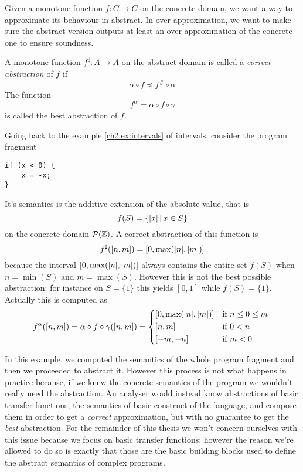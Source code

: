 Given a monotone function $f : C \rightarrow C$ on the concrete domain, we want a way to approximate its behaviour in abstract. In over approximation, we want to make sure the abstract version outputs at least an over-approximation of the concrete one to ensure soundness.
\begin{definition}
	A monotone function $f^{\sharp} : A \rightarrow A$ on the abstract domain is called a \textit{correct abstraction} of $f$ if
	\[
	\alpha \circ f \preceq f^{\#} \circ \alpha
	\]
	The function
	\[
	f^{\alpha} = \alpha \circ f \circ \gamma
	\]
	is called the best abstraction of $f$.
\end{definition}
\begin{example}
	Going back to the example \ref{ch2:ex:intervals} of intervals, consider the program fragment
\begin{verbatim}
if (x < 0) {
	x = -x;
}
\end{verbatim}
	It's semantics is the additive extension of the absolute value, that is
	\[
	f(S) = \{ \lvert x\rvert \,\vert\, x \in S \}
	\]
	on the concrete domain $\mathcal{P}(\mathbb{Z})$. A correct abstraction of this function is
	\[
	f^{\sharp}([n, m]) = [0, \max(\lvert n\rvert, \lvert m\rvert)]
	\]
	because the interval $[0, \max(\lvert n\rvert, \lvert m\rvert)]$ always contains the entire set $f(S)$ when $n = \min(S)$ and $m = \max(S)$. However this is not the best possible abstraction: for instance on $S = \{ 1 \}$ this yields $[0, 1]$ while $f(S) = \{ 1 \}$. Actually this is computed as
	\[
	f^{\alpha}([n, m]) = \alpha \circ f \circ \gamma([n, m]) = \begin{cases*}
		[0, \max(\abs{n}, \abs{m})] &if $n \le 0 \le m$ \\
		[n, m] &if $0 < n$ \\
		[-m, -n] &if $m < 0$ \\
	\end{cases*}
	\]
\end{example}
In this example, we computed the semantics of the whole program fragment and then we proceeded to abstract it. However this process is not what happens in practice because, if we knew the concrete semantics of the program we wouldn't really need the abstraction. An analyser would instead know abstractions of basic transfer functions, the semantics of basic construct of the language, and compose them in order to get a \textit{correct} approximation, but with no guarantee to get the \textit{best} abstraction. For the remainder of this thesis we won't concern ourselves with this issue because we focus on basic transfer functions; however the reason we're allowed to do so is exactly that those are the basic building blocks used to define the abstract semantics of complex programs.
